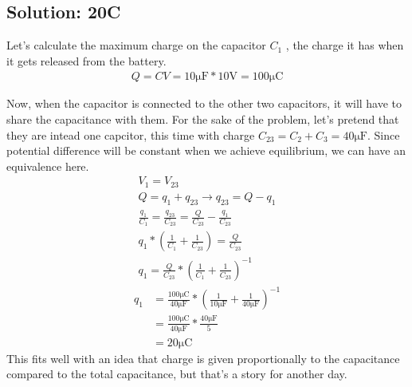 \documentclass[12pt]{article}
\begin{document}
\subsection*{Solution: 20\textmu C}
Let's calculate the maximum charge on the capacitor $C_1$ , the charge it has when it gets released from the battery.
\begin{align*}
    Q   =   CV
        =   10\unit{\micro\farad}*10\unit{\volt}
        =   100\unit{\micro\coulomb}
\end{align*}

Now, when the capacitor is connected to the other two capacitors, it will have to share the capacitance with them.
For the sake of the problem, let's pretend that they are intead one capcitor, this time with charge $C_{23} = C_2 + C_3 = 40\unit{\micro\farad}$.
Since potential difference will be constant when we achieve equilibrium, we can have an equivalence here.
\begin{gather*}
    V_1 =   V_{23}\\
    Q   =   q_1 + q_{23} \rightarrow q_{23} = Q - q_{1}\\
    \frac{q_1}{C_1} =   \frac{q_{23}}{C_{23}}
        =   \frac{Q}{C_{23}} - \frac{q_1}{C_{23}}\\
    q_1 * \left( \frac{1}{C_1} + \frac{1}{C_{23}} \right)   =   \frac{Q}{C_{23}}\\
    q_1 =   \frac{Q}{C_{23}}*\left( \frac{1}{C_1} + \frac{1}{C_{23}} \right)^{-1}
\end{gather*}
\begin{align*}
    q_1 &=  \frac{100\unit{\micro\coulomb}}{40\unit{\micro\farad}}*\left( \frac{1}{10\unit{\micro\farad}} + \frac{1}{40\unit{\micro\farad}} \right)^{-1}\\
        &=  \frac{100\unit{\micro\coulomb}}{40\unit{\micro\farad}} * \frac{40\unit{\micro\farad}}{5}\\
        &=  \boxed{20\unit{\micro\coulomb}}
\end{align*}
This fits well with an idea that charge is given proportionally to the capacitance compared to the total capacitance, but that's a story for another day.

\pagebreak
\end{document}

